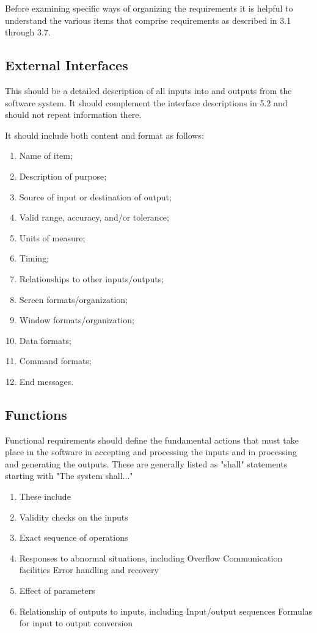 \documentclass[draftclsnofoot,onecolumn,10pt]{IEEEtran}
\begin{document}
\begin{enumerate}
Before examining specific ways of organizing the requirements it is helpful to
understand the various items that comprise requirements as described in 3.1
through 3.7.

\subsection{External Interfaces}

This should be a detailed description of all inputs into and outputs from the
software system. It should complement the interface descriptions in 5.2 and
should not repeat information there.

It should include both content and format as follows:
\begin{enumerate}
	\item Name of item;
	\item Description of purpose;
	\item Source of input or destination of output;
	\item Valid range, accuracy, and/or tolerance;
	\item Units of measure;
	\item Timing;
	\item Relationships to other inputs/outputs;
	\item Screen formats/organization;
	\item Window formats/organization;
	\item Data formats;
	\item Command formats;
	\item End messages.
\end{enumerate}

\subsection{Functions}
Functional requirements should define the fundamental actions that must take
place in the software in accepting and processing the inputs and in processing
and generating the outputs. These are generally listed as "shall" statements
starting with "The system shall..."

\begin{enumerate}
	\item These include
	\item Validity checks on the inputs
	\item Exact sequence of operations
	\item Responses to abnormal situations, including
		\subitem Overflow
		\subitem Communication facilities
		\subitem Error handling and recovery
	\item Effect of parameters
	\item Relationship of outputs to inputs, including
		\subitem Input/output sequences
		\subitem Formulas for input to output conversion
\end{enumerate}



\end{enumerate}
\end{document}
